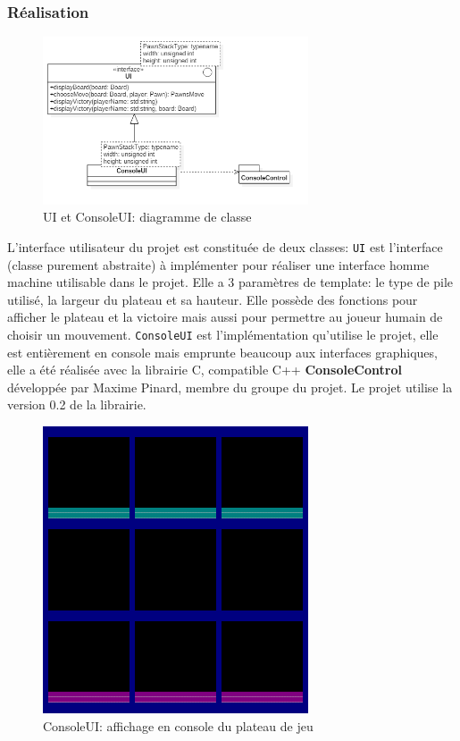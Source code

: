 \documentclass[article, backcover, french, nodocumentinfo]{upmethodology-document}
\begin{document}
			\subsubsection{Réalisation}
				\begin{figure}[H]
					\centering
					\includegraphics[width=0.7\textwidth]{figures/UIDiagram}
					\caption{UI et ConsoleUI: diagramme de classe}
					\label{fig:UIDiagram}
				\end{figure}
				L'interface utilisateur du projet est constituée de deux classes:
					\texttt{UI} est l'interface (classe purement abstraite) à implémenter pour réaliser une interface homme machine utilisable dans le projet. Elle a 3 paramètres de template: le type de pile utilisé, la largeur du plateau et sa hauteur. Elle possède des fonctions pour afficher le plateau et la victoire mais aussi pour permettre au joueur humain de choisir un mouvement.
					\texttt{ConsoleUI} est l'implémentation qu'utilise le projet, elle est entièrement en console mais emprunte beaucoup aux interfaces graphiques, elle a été réalisée avec la librairie C, compatible C++ \textbf{ConsoleControl} développée par Maxime Pinard, membre du groupe du projet. Le projet utilise la version 0.2 de la librairie.
					\begin{figure}[H]
						\centering
						\includegraphics[width=0.7\textwidth]{figures/ConsoleUI}
						\caption{ConsoleUI: affichage en console du plateau de jeu}
						\label{fig:ConsoleUI}
					\end{figure}
\end{document}
